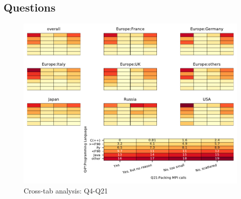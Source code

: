 
\subsection{Questions}


\begin{figure}
\begin{center}
\includegraphics[width=12cm]{../pdfs/Q4-Q21.pdf}
\caption{Cross-tab analysis: Q4-Q21}
\label{fig:Q4-Q21}
\end{center}
\end{figure}
